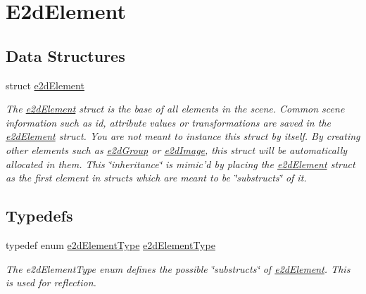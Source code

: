 \hypertarget{group__e2dElement}{\section{E2d\-Element}
\label{group__e2dElement}
}
\subsection*{Data Structures}
\begin{DoxyCompactItemize}
\item 
struct \hyperlink{structe2dElement}{e2d\-Element}
\begin{DoxyCompactList}\small\item\em The \hyperlink{structe2dElement}{e2d\-Element} struct is the base of all elements in the scene. Common scene information such as id, attribute values or transformations are saved in the \hyperlink{structe2dElement}{e2d\-Element} struct. You are not meant to instance this struct by itself. By creating other elements such as \hyperlink{structe2dGroup}{e2d\-Group} or \hyperlink{structe2dImage}{e2d\-Image}, this struct will be automatically allocated in them. This \char`\"{}inheritance\char`\"{} is mimic'd by placing the \hyperlink{structe2dElement}{e2d\-Element} struct as the first element in structs which are meant to be \char`\"{}substructs\char`\"{} of it. \end{DoxyCompactList}\end{DoxyCompactItemize}
\subsection*{Typedefs}
\begin{DoxyCompactItemize}
\item 
\hypertarget{group__e2dElement_ga13e962cd8fa5eaa7d4bec3fc7d774d59}{typedef enum \hyperlink{group__e2dElement_ga9bc8cfdec08c7e9069fc707ee456fd38}{e2d\-Element\-Type} \hyperlink{group__e2dElement_ga13e962cd8fa5eaa7d4bec3fc7d774d59}{e2d\-Element\-Type}}\label{group__e2dElement_ga13e962cd8fa5eaa7d4bec3fc7d774d59}

\begin{DoxyCompactList}\small\item\em The e2d\-Element\-Type enum defines the possible \char`\"{}substructs\char`\"{} of \hyperlink{structe2dElement}{e2d\-Element}. This is used for reflection. \end{DoxyCompactList}\end{DoxyCompactItemize}

